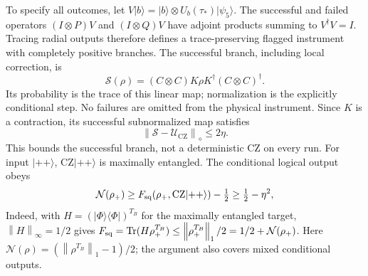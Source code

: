 \documentclass[11pt]{article}
\newcommand{\norm}[1]{\left\lVert#1\right\rVert}
\newcommand{\ket}[1]{\lvert#1\rangle}
\newcommand{\bra}[1]{\langle#1\rvert}
\newcommand{\CZ}{\mathrm{CZ}}
\begin{document}
To specify all outcomes, let $V\ket b=\ket b\otimes U_b(\tau_*)\ket{\psi_5}$.
The successful and failed operators $(I\otimes P)V$ and $(I\otimes Q)V$ have adjoint products summing to $V^\dagger V=I$.
Tracing radial outputs therefore defines a trace-preserving flagged instrument with completely positive branches.
The successful branch, including local correction, is
\begin{equation}
 \mathcal S(\rho)=(C\otimes C)K\rho K^\dagger(C\otimes C)^\dagger.
\end{equation}
Its probability is the trace of this linear map; normalization is the explicitly conditional step.
No failures are omitted from the physical instrument.
Since $K$ is a contraction, its successful subnormalized map satisfies
\begin{equation}
 \norm{\mathcal S-\mathcal U_{\CZ}}_\diamond\leq2\eta.\label{eq:diamond}
\end{equation}
This bounds the successful branch, not a deterministic CZ on every run.
For input $\ket{++}$, $\CZ\ket{++}$ is maximally entangled.
The conditional logical output obeys
\begin{equation}
 \mathcal N(\rho_+)\geq F_{\rm sq}(\rho_+,\CZ\ket{++})-\tfrac12
 \geq\tfrac12-\eta^2,\label{eq:neg}
\end{equation}
Indeed, with $H=(\ket\Phi\bra\Phi)^{T_B}$ for the maximally entangled target, $\norm H_\infty=1/2$ gives
$F_{\rm sq}=\operatorname{Tr}(H\rho_+^{T_B})\leq\norm{\rho_+^{T_B}}_1/2=1/2+\mathcal N(\rho_+)$.
Here $\mathcal N(\rho)=(\norm{\rho^{T_B}}_1-1)/2$; the argument also covers mixed conditional outputs.
\end{document}
